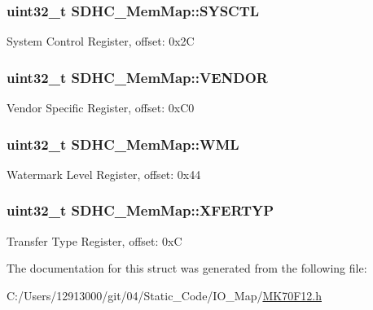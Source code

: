 \subsubsection[{S\+Y\+S\+C\+T\+L}]{\setlength{\rightskip}{0pt plus 5cm}uint32\+\_\+t S\+D\+H\+C\+\_\+\+Mem\+Map\+::\+S\+Y\+S\+C\+T\+L}\label{struct_s_d_h_c___mem_map_ae3204e728de4488f0b3569d1ebac78ae}
System Control Register, offset\+: 0x2\+C \hypertarget{struct_s_d_h_c___mem_map_ac3938ee338b7499c8b1cebed71604299}{}
\subsubsection[{V\+E\+N\+D\+O\+R}]{\setlength{\rightskip}{0pt plus 5cm}uint32\+\_\+t S\+D\+H\+C\+\_\+\+Mem\+Map\+::\+V\+E\+N\+D\+O\+R}\label{struct_s_d_h_c___mem_map_ac3938ee338b7499c8b1cebed71604299}
Vendor Specific Register, offset\+: 0x\+C0 \hypertarget{struct_s_d_h_c___mem_map_a8c1eb45065f5eb8878fc02701f2a6750}{}
\subsubsection[{W\+M\+L}]{\setlength{\rightskip}{0pt plus 5cm}uint32\+\_\+t S\+D\+H\+C\+\_\+\+Mem\+Map\+::\+W\+M\+L}\label{struct_s_d_h_c___mem_map_a8c1eb45065f5eb8878fc02701f2a6750}
Watermark Level Register, offset\+: 0x44 \hypertarget{struct_s_d_h_c___mem_map_ad6c008e044af83f7411e51258f111c48}{}
\subsubsection[{X\+F\+E\+R\+T\+Y\+P}]{\setlength{\rightskip}{0pt plus 5cm}uint32\+\_\+t S\+D\+H\+C\+\_\+\+Mem\+Map\+::\+X\+F\+E\+R\+T\+Y\+P}\label{struct_s_d_h_c___mem_map_ad6c008e044af83f7411e51258f111c48}
Transfer Type Register, offset\+: 0x\+C 

The documentation for this struct was generated from the following file\+:\begin{DoxyCompactItemize}
\item 
C\+:/\+Users/12913000/git/04/\+Static\+\_\+\+Code/\+I\+O\+\_\+\+Map/\hyperlink{_m_k70_f12_8h}{M\+K70\+F12.\+h}\end{DoxyCompactItemize}
